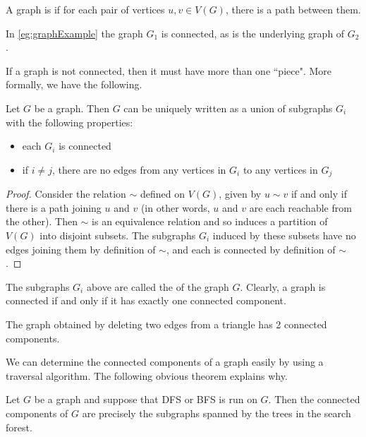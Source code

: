 \begin{Definition} 
A graph is  if for each pair of 
vertices $u, v\in V(G)$, there is a path between them.
\end{Definition}

In \cref{eg:graphExample} the graph $G_1$ is connected, as is the
underlying graph of $G_2$. 

If a graph is not connected, then it must have more than one ``piece".
More formally, we have the following.

\begin{Theorem}
\label{thm:components}
Let $G$ be a graph. Then $G$ can be uniquely written as a union of
subgraphs $G_i$ with the following properties:
\begin{itemize}
\item each $G_i$ is connected
\item if $i\neq j$, there are no edges from any vertices in $G_i$ 
to any vertices in $G_j$
\end{itemize}
\end{Theorem}

\begin{proof}
Consider the relation $\sim$ defined on $V(G)$, given by $u\sim v$ if
and only if there is a path joining $u$ and $v$ (in other words, $u$ and
$v$ are each reachable from the other). Then $\sim$ is an equivalence
relation and so induces a partition of $V(G)$ into disjoint subsets. The
subgraphs $G_i$ induced by these subsets have no edges joining them by
definition of $\sim$, and each is connected by definition of $\sim$.
\end{proof}

The subgraphs $G_i$ above are called the 
of the graph $G$. Clearly, a graph is connected if and only if it has
exactly one connected component.

\begin{Example}
\label{eg:components}
The graph obtained by deleting two edges from a triangle has 2 connected 
components.
\end{Example}

We can determine the connected components of a graph easily by using a
traversal algorithm. The following obvious theorem explains why.

\begin{Theorem}
\label{thm:trav-comps}
Let $G$ be a graph and suppose that DFS or BFS is run on $G$. Then the
connected components of $G$ are precisely the subgraphs spanned by the
trees in the search forest. 
\end{Theorem}

